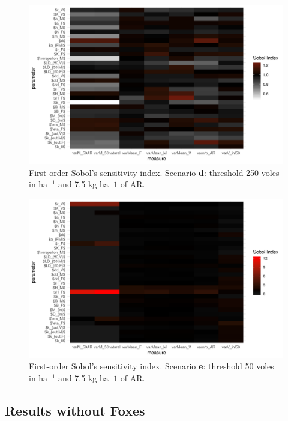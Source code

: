 \documentclass[11pt]{article}
\begin{document}
\begin{figure}[!htb]
	\begin{center}
		\includegraphics[width=\linewidth]{img/plt_sobolIndex_250_7_5.png}
		\caption{First-order Sobol's sensitivity index. Scenario \textbf{d}: threshold 250 voles in ha$^{-1}$ and 7.5 kg ha$^-1$ of AR.}
	\end{center}
\end{figure}


\begin{figure}[!htb]
	\begin{center}
		\includegraphics[width=\linewidth]{img/plt_sobolIndex_50_7_5.png}
		\caption{First-order Sobol's sensitivity index. Scenario \textbf{e}: threshold 50 voles in ha$^{-1}$ and 7.5 kg ha$^-1$ of AR.}
	\end{center}
\end{figure}

 \clearpage

\subsection{Results without Foxes}
\end{document}
